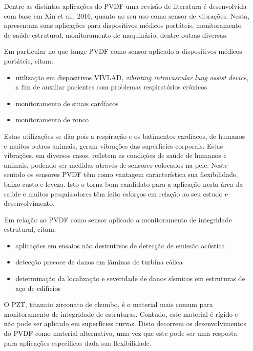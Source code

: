 \documentclass[
	12pt,				
	oneside,			
	a4paper,			
	english,			
	brazil,			
	]{abntex2ppgsi}
\begin{document}
Dentre as distintas aplicações do PVDF uma revisão de literatura é desenvolvida com base em Xin et al., 2016, quanto ao seu uso como sensor de vibrações. Nesta, apresentam suas aplicações para dispositivos médicos portáteis, monitoramento de saúde estrutural, monitoramento de maquinário, dentre outras diversas.

Em particular no que tange PVDF como sensor aplicado a dispositivos médicos portáteis, citam:

\begin{itemize}
	\item utilização em dispositivos VIVLAD, \textit{vibrating intravascular lung assist device}, a fim de auxiliar pacientes com problemas respiratórios crônicos 
	\item monitoramento de sinais cardíacos 
	\item monitoramento de ronco 
\end{itemize}

Estas utilizações se dão pois a respiração e os batimentos cardíacos, de humanos e muitos outros animais, geram vibrações das superfícies corporais. Estas vibrações, em diversos casos, refletem as condições de saúde de humanos e animais, podendo ser medidas através de sensores colocados na pele. Neste sentido os sensores PVDF têm como vantagem característica sua flexibilidade, baixo custo e leveza. Isto o torna bom candidato para a aplicação nesta área da saúde e muitos pesquisadores têm feito esforços em relação ao seu estudo e desenvolvimento.

Em relação ao PVDF como sensor aplicado a monitoramento de integridade estrutural, citam:

\begin{itemize}
	\item aplicações em ensaios não destrutivos de detecção de emissão acústica
	\item detecção precoce de danos em lâminas de turbina eólica 
	\item determinação da localização e severidade de danos sísmicos em estruturas de aço de edifícios
\end{itemize}

O PZT, titanato zirconato de chumbo, é o material mais comum para monitoramento de integridade de estruturas. Contudo, este material é rígido e não pode ser aplicado em superfícies curvas. Disto decorrem os desenvolvimentos do PVDF como material alternativo, uma vez que este pode ser uma resposta para aplicações específicas dada sua flexibilidade.
\end{document}
